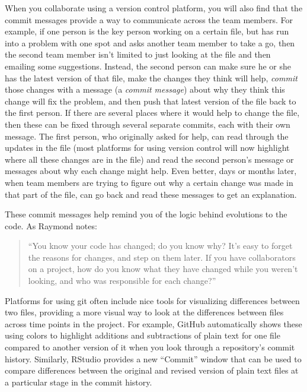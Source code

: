 \documentclass[]{tufte-book}
\begin{document}
When you collaborate using a version control platform, you will also find that
the commit messages provide a way to communicate across the team members. For
example, if one person is the key person working on a certain file, but has run
into a problem with one spot and asks another team member to take a go, then the
second team member isn't limited to just looking at the file and then emailing
some suggestions. Instead, the second person can make sure he or she has the
latest version of that file, make the changes they think will help,
\emph{commit} those changes with a message (a \emph{commit message}) about why they think
this change will fix the problem, and then push that latest version of the file
back to the first person. If there are several places where it would help to
change the file, then these can be fixed through several separate commits, each
with their own message. The first person, who originally asked for help, can
read through the updates in the file (most platforms for using version control
will now highlight where all these changes are in the file) and read the second
person's message or messages about why each change might help. Even better, days
or months later, when team members are trying to figure out why a certain change
was made in that part of the file, can go back and read these messages to get an
explanation.

These commit messages help remind you of the logic behind evolutions to the
code. As Raymond notes:

\begin{quote}
``You know your code has changed; do you know why? It's easy to forget the
reasons for changes, and step on them later. If you have collaborators on a
project, how do you know what they have changed while you weren't looking, and
who was responsible for each change?''
\end{quote}

Platforms for using git often include nice tools for visualizing differences
between two files, providing a more visual way to look at the differences between
files across time points in the project. For example, GitHub automatically shows
these using colors to highlight additions and subtractions of plain text for
one file compared to another version of it when you look through a repository's
commit history. Similarly, RStudio provides a new ``Commit'' window that can be
used to compare differences between the original and revised version of plain
text files at a particular stage in the commit history.
\end{document}
